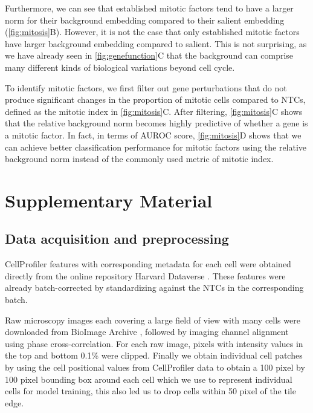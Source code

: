 \documentclass{article}
\begin{document}
Furthermore, we can see that established mitotic factors tend to have a larger norm for their background embedding compared to their salient embedding (\autoref{fig:mitosis}B). However, it is not the case that only established mitotic factors have larger background embedding compared to salient. This is not surprising, as we have already seen in \autoref{fig:genefunction}C that the background can comprise many different kinds of biological variations beyond cell cycle.

To identify mitotic factors, we first filter out gene perturbations that do not produce significant changes in the proportion of mitotic cells compared to NTCs, defined as the mitotic index in \autoref{fig:mitosis}C. After filtering, \autoref{fig:mitosis}C shows that the relative background norm becomes highly predictive of whether a gene is a mitotic factor. In fact, in terms of AUROC score, \autoref{fig:mitosis}D shows that we can achieve better classification performance for mitotic factors using the relative background norm instead of the commonly used metric of mitotic index.


\begin{ack}

\end{ack}



\section{Supplementary Material}


\subsection*{Data acquisition and preprocessing}
CellProfiler features with corresponding metadata for each cell were obtained directly from the online repository Harvard Dataverse \citep{DVN/VYKTI5_2022}. These features were already batch-corrected by standardizing against the NTCs in the corresponding batch. 

Raw microscopy images each covering a large field of view with many cells were downloaded from BioImage Archive \citep{LukeFunk2022}, followed by imaging channel alignment using phase cross-correlation. For each raw image, pixels with intensity values in the top and bottom 0.1\% were clipped. Finally we obtain individual cell patches by using the cell positional values from CellProfiler data to obtain a 100 pixel by 100 pixel bounding box around each cell which we use to represent individual cells for model training, this also led us to drop cells within 50 pixel of the tile edge.


\vskip 0.2in

 


\end{document}
